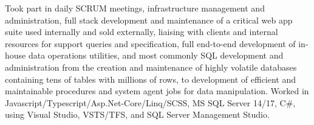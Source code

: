 \documentclass[11pt, a4paper]{cv}
\begin{document}
\begin{minipage}[t]{0.66\textwidth}

\sectionspace


\vspace{\topsep} %
\begin{tightitemize}
\item Took part in daily SCRUM meetings, infrastructure management and administration, full stack development and maintenance of a critical web app suite used internally and sold externally, liaising with clients and internal resources for support queries and specification, full end-to-end development of in-house data operations utilities, and most commonly SQL development and administration from the creation and maintenance of highly volatile databases containing tens of tables with millions of rows, to development of efficient and maintainable procedures and system agent jobs for data manipulation. Worked in Javascript/Typescript/Asp.Net-Core/Linq/SCSS, MS SQL Server 14/17, C\#, using Visual Studio, VSTS/TFS, and SQL Server Management Studio.
\end{tightitemize}

\sectionspace %

\end{minipage} %
\end{document}
